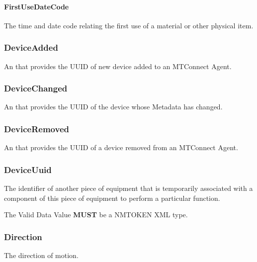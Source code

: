\paragraph{FirstUseDateCode}\mbox{}
\label{sec:FirstUseDateCode}


The time and date code relating the first use of a material or other physical item.


\subsubsection{DeviceAdded}
\label{sec:DeviceAdded}



An  that provides the \gls{UUID} of new device added to an \gls{MTConnect Agent}.


\subsubsection{DeviceChanged}
\label{sec:DeviceChanged}



An  that provides the \gls{UUID} of the device whose \gls{Metadata} has changed.


\subsubsection{DeviceRemoved}
\label{sec:DeviceRemoved}



An  that provides the \gls{UUID} of a device removed from an \gls{MTConnect Agent}.


\subsubsection{DeviceUuid}
\label{sec:DeviceUuid}



The identifier of another piece of equipment that is temporarily associated with a component of this piece of equipment to perform a particular function.
  
 The \gls{Valid Data Value} \textbf{MUST} be a NMTOKEN XML type.


\subsubsection{Direction}




The direction of motion.


